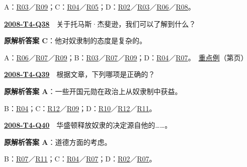 \documentclass[11pt,a4paper]{article}
\begin{document}
\noindent A：\hyperref[cat-R03]{R03}／\hyperref[cat-R09]{R09}；C：\hyperref[cat-R04]{R04}／\hyperref[cat-R05]{R05}；D：\hyperref[cat-R02]{R02}／\hyperref[cat-R03]{R03}／\hyperref[cat-R06]{R06}／\hyperref[cat-R08]{R08}。\par\smallskip
{}\label{idx-2008-T4-Q38}\noindent\textbf{\href{https://zj139.github.io/math-notes/english/a16ec662060c5d5cc8e15f6b/\#q38}{2008-T4-Q38}}　关于托马斯·杰斐逊，我们可以了解到什么？\par\nopagebreak
\noindent\textbf{原解析答案 C}：他对奴隶制的态度是复杂的。\par\nopagebreak
\noindent A：\hyperref[cat-R06]{R06}／\hyperref[cat-R07]{R07}／\hyperref[cat-R09]{R09}；B：\hyperref[cat-R03]{R03}／\hyperref[cat-R07]{R07}／\hyperref[cat-R09]{R09}；D：\hyperref[cat-R04]{R04}／\hyperref[cat-R07]{R07}。　\hyperref[case-2008-T4-Q38]{重点例}（第\pageref{case-2008-T4-Q38}页）\par\smallskip
{}\label{idx-2008-T4-Q39}\noindent\textbf{\href{https://zj139.github.io/math-notes/english/a16ec662060c5d5cc8e15f6b/\#q39}{2008-T4-Q39}}　根据文章，下列哪项是正确的？\par\nopagebreak
\noindent\textbf{原解析答案 A}：一些开国元勋在政治上从奴隶制中获益。\par\nopagebreak
\noindent B：\hyperref[cat-R04]{R04}；C：\hyperref[cat-R12]{R12}／\hyperref[cat-R09]{R09}；D：\hyperref[cat-R10]{R10}／\hyperref[cat-R12]{R12}／\hyperref[cat-R11]{R11}。\par\smallskip
{}\label{idx-2008-T4-Q40}\noindent\textbf{\href{https://zj139.github.io/math-notes/english/a16ec662060c5d5cc8e15f6b/\#q40}{2008-T4-Q40}}　华盛顿释放奴隶的决定源自他的……。\par\nopagebreak
\noindent\textbf{原解析答案 A}：道德方面的考虑。\par\nopagebreak
\noindent B：\hyperref[cat-R07]{R07}／\hyperref[cat-R11]{R11}；C：\hyperref[cat-R04]{R04}／\hyperref[cat-R07]{R07}；D：\hyperref[cat-R02]{R02}／\hyperref[cat-R07]{R07}。\par\smallskip
\clearpage
\end{document}
